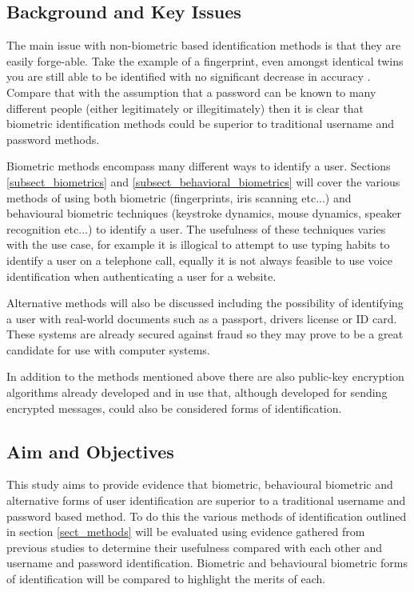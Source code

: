 \documentclass[12pt]{article}
\begin{document}
	
	\subsection{Background and Key Issues}
	The main issue with non-biometric based identification methods is that they are easily forge-able. Take the example of a fingerprint, even amongst identical twins you are still able to be identified with no significant decrease in accuracy \citep{han2004study}. Compare that with the assumption that a password can be known to many different people (either legitimately or illegitimately) then it is clear that biometric identification methods could be superior to traditional username and password methods.
	
	Biometric methods encompass many different ways to identify a user. Sections
	\ref{subsect_biometrics} and \ref{subsect_behavioral_biometrics} will cover the various methods of using both biometric (fingerprints, iris scanning etc...) and behavioural biometric techniques (keystroke dynamics, mouse dynamics, speaker recognition etc...) to identify a user. The usefulness of these techniques varies with the use case, for example it is illogical to attempt to use typing habits to identify a user on a telephone call, equally it is not always feasible to use voice identification when authenticating a user for a website.
	
	Alternative methods will also be discussed including the possibility of identifying a user with real-world documents such as a passport, drivers license or ID card. These systems are already secured against fraud so they may prove to be a great candidate for use with computer systems.
	
	In addition to the methods mentioned above there are also public-key encryption algorithms already developed and in use that, although developed for sending encrypted messages, could also be considered forms of identification.
	
	\subsection{Aim and Objectives} 
	This study aims to provide evidence that biometric, behavioural biometric and alternative forms of user identification are superior to a traditional username and password based method.
	To do this the various methods of identification outlined in section \ref{sect_methods} will be evaluated using evidence gathered from previous studies to determine their usefulness compared with each other and username and password identification.
	Biometric and behavioural biometric forms of identification will be compared to highlight the merits of each.
	
\end{document}
